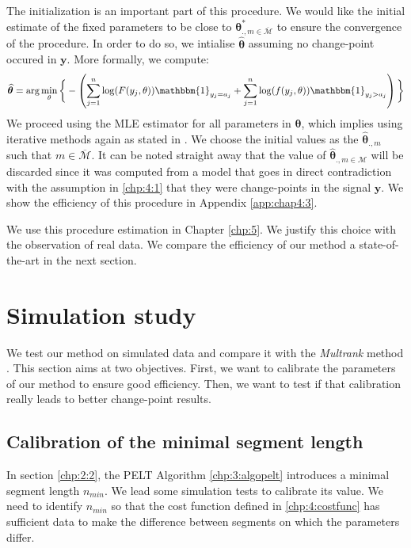 The initialization is an important part of this procedure. We would like the initial estimate of the fixed parameters to be close to $\bm\theta^*_{{.,m\in\overline{\mathcal{M}}}}$ to ensure the convergence of the procedure. In order to do so, we intialise $\widehat{\bm\theta}$ assuming no change-point occured in $\bm y$.  More formally, we compute: 
\begin{equation}\label{chp:4:init}
\widehat{\bm\theta} = \arg\min_{\theta}\bigg\{ - \left(\sum_{j=1}^{n}\log(F(y_j,\theta))\mathbbm{1}_{y_j=a_j}+\sum_{j=1}^{n}\log(f(y_j,\theta))\mathbbm{1}_{y_j>a_j}\right)\bigg\}
\end{equation}   
We proceed using the MLE estimator for all parameters in $\bm \theta$, which implies using iterative methods again as stated in \cite{cohen1965maximum}. We choose the initial values as the $\widehat{\bm\theta}_{.,m}$ such that $m\in\overline{\mathcal{M}}$. It can be noted straight away that the value of $\widehat{\bm\theta}_{.,m\in\mathcal{M}}$ will be discarded since it was computed from a model that goes in direct contradiction with the assumption in \ref{chp:4:1} that they were change-points in the signal $\bm y$. We show the efficiency of this procedure in Appendix \ref{app:chap4:3}.  

We use this procedure estimation in Chapter \ref{chp:5}. We justify this choice with the observation of real data. We compare the efficiency of our method a state-of-the-art in the next section.

\section{Simulation study}\label{chp:4:4}

We test our method on simulated data and compare it with the \textit{Multrank} method \cite{lung2015}. This section aims at two objectives. First, we want to calibrate the parameters of our method to ensure good efficiency. Then, we want to test if that calibration really leads to better change-point results.  

\subsection{Calibration of the minimal segment length}

In section \ref{chp:2:2}, the PELT Algorithm \ref{chp:3:algopelt} introduces a minimal segment length $n_{min}$. We lead some simulation tests to calibrate its value. We need to identify $n_{min}$ so that the cost function defined in \ref{chp:4:costfunc} has sufficient data to make the difference between segments on which the parameters differ. 

